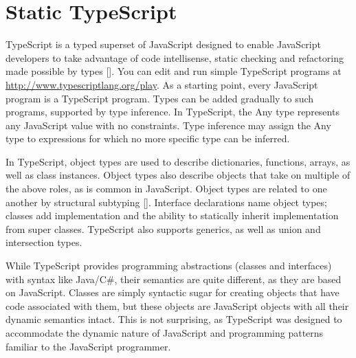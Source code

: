 \section{Static TypeScript}
\label{sec:sts}

TypeScript is a typed superset of JavaScript designed to enable JavaScript developers to take advantage of code 
intellisense, static checking and refactoring made possible by types [].  You can edit and run simple TypeScript 
programs at \url{http://www.typescriptlang.org/play}. As a starting point, every JavaScript program is a TypeScript
program.  Types can be added gradually to such programs, supported by type inference. In TypeScript, the Any type 
represents any JavaScript value with no constraints. Type inference may assign the Any type to expressions for which 
no more specific type can be inferred.

In TypeScript, object types are used to describe dictionaries, functions, arrays, as well as class instances. Object 
types also describe objects that take on multiple of the above roles, as is common in JavaScript. Object types are
related to one another by structural subtyping [].  Interface declarations name object types; classes add implementation
and the ability to statically inherit implementation from super classes. TypeScript also supports generics, as well as
union and intersection types.

While TypeScript provides programming abstractions (classes and interfaces) with syntax like Java/C\#, their semantics
are quite different, as they are based on JavaScript.  Classes are simply syntactic sugar for creating objects that
have code associated with them, but these objects are JavaScript objects with all their dynamic semantics intact. This
is not surprising, as TypeScript was designed to accommodate the dynamic nature of JavaScript and programming patterns
familiar to the JavaScript programmer. 

